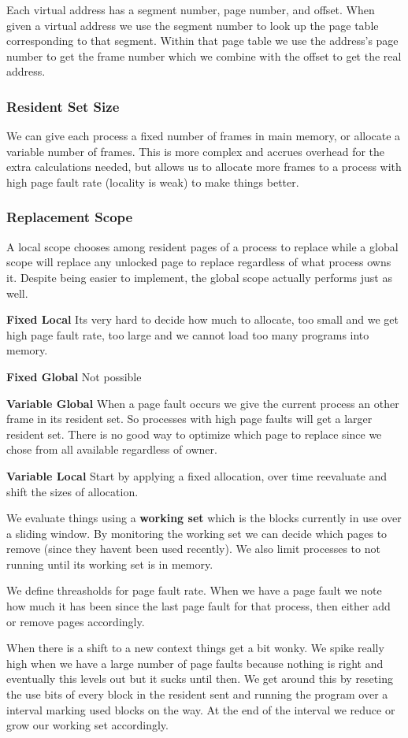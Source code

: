 \documentclass[12pt]{article}
\begin{document}
Each virtual address has a segment number, page number, and offset. When given a virtual address we use the segment number to look up the page table corresponding to that segment. Within that page table we use the address's page number to get the frame number which we combine with the offset to get the real address.

\subsubsection*{Resident Set Size}
We can give each process a fixed number of frames in main memory, or allocate a variable number of frames. This is more complex and accrues overhead for the extra calculations needed, but allows us to allocate more frames to a process with high page fault rate (locality is weak) to make things better.

\subsubsection*{Replacement Scope}
A local scope chooses among resident pages of a process to replace while a global scope will replace any unlocked page to replace regardless of what process owns it. Despite being easier to implement, the global scope actually performs just as well.

\textbf{Fixed Local}
Its very hard to decide how much to allocate, too small and we get high page fault rate, too large and we cannot load too many programs into memory.

\textbf{Fixed Global} Not possible

\textbf{Variable Global} When a page fault occurs we give the current process an other frame in its resident set. So processes with high page faults will get a larger resident set. There is no good way to optimize which page to replace since we chose from all available regardless of owner.

\textbf{Variable Local} Start by applying a fixed allocation, over time reevaluate and shift the sizes of allocation.

We evaluate things using a \textbf{working set} which is the blocks currently in use over a sliding window. By monitoring the working set we can decide which pages to remove (since they havent been used recently). We also limit processes to not running until its working set is in memory.

We define threasholds for page fault rate. When we have a page fault we note how much it has been since the last page fault for that process, then either add or remove pages accordingly.

When there is a shift to a new context things get a bit wonky. We spike really high when we have a large number of page faults because nothing is right and eventually this levels out but it sucks until then. We get around this by reseting the use bits of every block in the resident sent and running the program over a interval marking used blocks on the way. At the end of the interval we reduce or grow our working set accordingly.
\end{document}
